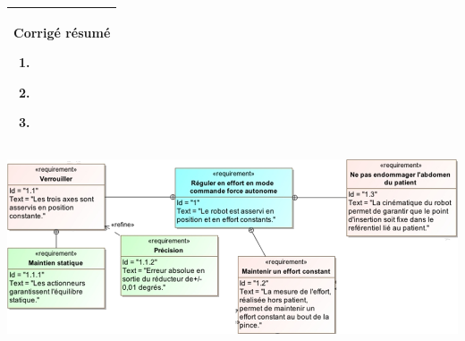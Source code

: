 \documentclass[10pt,fleqn]{article} %
\begin{document}
\begin{multicols}{2}
\ifprof
\else
\begin{center}
\begin{tabular}{|p{.95\linewidth}|}
\hline
\textbf{Corrigé résumé}
\begin{enumerate}
\item $\quad$
\item $\quad$
\item $\quad$
\end{enumerate} \\
\hline
\end{tabular}
\end{center}
\fi


\ifprof
\else
\end{multicols}
\fi

\ifprof
\else

\vspace{1cm}
\begin{center}
\includegraphics[width=\linewidth]{images/fig_03}
\end{center}
\fi
\end{document}
